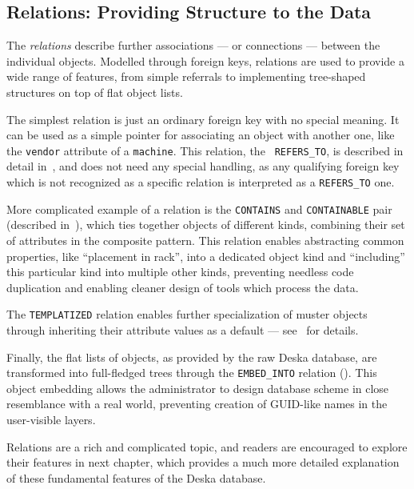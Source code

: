 \documentclass[deska]{subfiles}
\begin{document}
\subsection{Relations: Providing Structure to the Data}

The {\em relations} describe further associations --- or connections --- between the individual objects.  Modelled
through foreign keys, relations are used to provide a wide range of features, from simple referrals to implementing
tree-shaped structures on top of flat object lists.

The simplest relation is just an ordinary foreign key with no special meaning.  It can be used as a simple pointer for
associating an object with another one, like the {\tt vendor} attribute of a {\tt machine}.  This relation, the {\tt
REFERS\_TO}, is described in detail in~, and does not need any special handling, as any
qualifying foreign key which is not recognized as a specific relation is interpreted as a {\tt REFERS\_TO} one.

More complicated example of a relation is the {\tt CONTAINS} and {\tt CONTAINABLE} pair (described
in~), which ties together objects of different kinds, combining their set of attributes in
the composite pattern.  This relation enables abstracting common properties, like ``placement in rack'', into a
dedicated object kind and ``including'' this particular kind into multiple other kinds, preventing needless code
duplication and enabling cleaner design of tools which process the data.

The {\tt TEMPLATIZED} relation enables further specialization of muster objects through inheriting their attribute
values as a default --- see~ for details.

Finally, the flat lists of objects, as provided by the raw Deska database, are transformed into full-fledged trees
through the {\tt EMBED\_INTO} relation ().  This object embedding allows the
administrator to design database scheme in close resemblance with a real world, preventing creation of GUID-like names
in the user-visible layers.

Relations are a rich and complicated topic, and readers are encouraged to explore their features in next chapter,
which provides a much more detailed explanation of these fundamental features of the Deska database.
\end{document}
